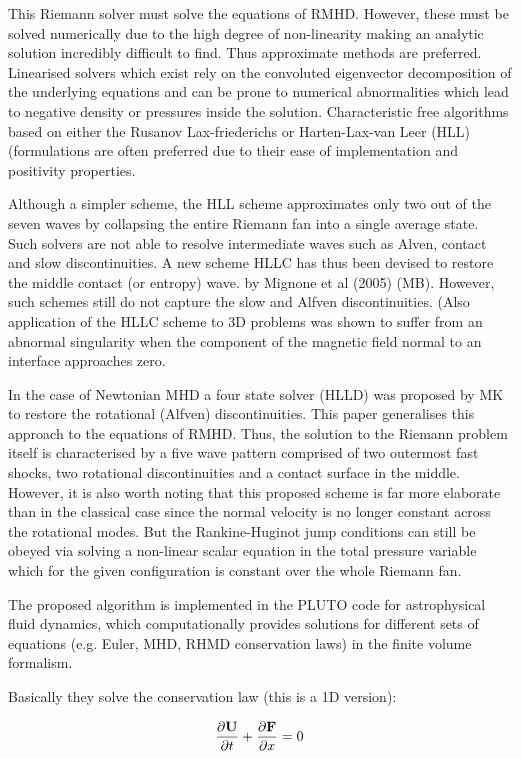\documentclass{article}
\begin{document}
This Riemann solver must solve the equations of RMHD. However, these must be solved numerically due to the high degree of non-linearity making an analytic solution incredibly difficult to find. Thus approximate methods are preferred. Linearised solvers which exist rely on the convoluted eigenvector decomposition of the underlying equations and can be prone to numerical abnormalities which lead to negative density or pressures inside the solution. Characteristic free algorithms based on either the Rusanov Lax-friederichs or Harten-Lax-van Leer (HLL) (formulations are often preferred due to their ease of implementation and positivity properties. 

Although a simpler scheme, the HLL scheme approximates only two out of the seven waves by collapsing the entire Riemann fan into a single average state. Such solvers are not able to resolve intermediate waves such as Alven, contact and slow discontinuities. A new scheme HLLC has thus been devised to restore the middle contact (or entropy) wave. by Mignone et al (2005) (MB). However, such schemes still do not capture the slow and Alfven discontinuities. (Also application of the HLLC scheme to 3D problems was shown to suffer from an abnormal singularity when the component of the magnetic field normal to an interface approaches zero. 

In the case of Newtonian MHD a four state solver (HLLD) was proposed by MK to restore the rotational (Alfven) discontinuities. This paper generalises this approach to the equations of RMHD. Thus, the solution to the Riemann problem itself is characterised by a five wave pattern comprised of two outermost fast shocks, two rotational discontinuities and a contact surface in the middle. However, it is also worth noting that this proposed scheme is far more elaborate than in the classical case since the normal velocity is no longer constant across the rotational modes. But the Rankine-Huginot jump conditions can still be obeyed via solving a non-linear scalar equation in the total pressure variable which for the given configuration is constant over the whole Riemann fan. 

The proposed algorithm is implemented in the PLUTO code for astrophysical fluid dynamics, which computationally provides solutions for different sets of equations (e.g. Euler, MHD, RHMD conservation laws) in the finite volume formalism. 

Basically they solve the conservation law (this is a 1D version):

\begin{align}
    \pdv{\mathbf{U}}{t}+\pdv{\mathbf{F}}{x}=0
\end{align}
\end{document}
